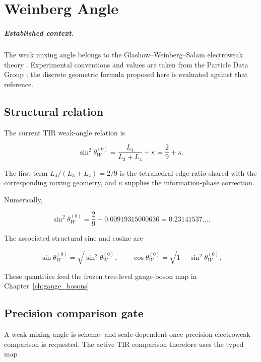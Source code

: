 \chapter{Weinberg Angle}
\label{ch:weinberg_angle}

\paragraph{Established context.}
The weak mixing angle belongs to the Glashow--Weinberg--Salam electroweak theory
\cite{Glashow1961,Weinberg1967,Salam1968}. Experimental conventions and values
are taken from the Particle Data Group \cite{PDG2024}; the discrete geometric
formula proposed here is evaluated against that reference.


\section{Structural relation}

The current TIR weak-angle relation is

\begin{equation}
\sin^2\theta_W^{(0)}
= \frac{L_4}{L_3+L_4}+\kappa
= \frac29+\kappa.
\label{eq:weinberg}
\end{equation}

The first term $L_4/(L_3+L_4)=2/9$ is the tetrahedral edge ratio shared with
the corresponding mixing geometry, and $\kappa$ supplies the information-phase
correction.

Numerically,

\[
\sin^2\theta_W^{(0)}
=\frac29+0.00919315000636
=0.23141537\ldots.
\]

The associated structural sine and cosine are

\[
\sin\theta_W^{(0)}=\sqrt{\sin^2\theta_W^{(0)}},
\qquad
\cos\theta_W^{(0)}=\sqrt{1-\sin^2\theta_W^{(0)}}.
\]

These quantities feed the frozen tree-level gauge-boson map in
Chapter~\ref{ch:gauge_bosons}.

\section{Precision comparison gate}

A weak mixing angle is scheme- and scale-dependent once precision electroweak
comparison is requested.  The active TIR comparison therefore uses the typed
map

